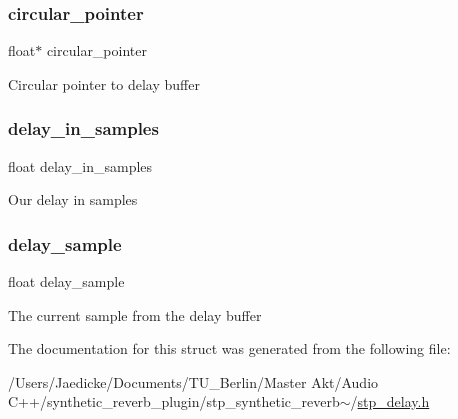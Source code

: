 \subsubsection{\texorpdfstring{circular\+\_\+pointer}{circular\_pointer}}
{\footnotesize\ttfamily float$\ast$ circular\+\_\+pointer}

Circular pointer to delay buffer \mbox{\label{structstp__delay_a1e57a43103f17324d4e3f4132fc8d195}} 
\subsubsection{\texorpdfstring{delay\+\_\+in\+\_\+samples}{delay\_in\_samples}}
{\footnotesize\ttfamily float delay\+\_\+in\+\_\+samples}

Our delay in samples \mbox{\label{structstp__delay_ab1cecaf78849bc3aadab1ef39c4f45b7}} 
\subsubsection{\texorpdfstring{delay\+\_\+sample}{delay\_sample}}
{\footnotesize\ttfamily float delay\+\_\+sample}

The current sample from the delay buffer 

The documentation for this struct was generated from the following file\+:\begin{DoxyCompactItemize}
\item 
/\+Users/\+Jaedicke/\+Documents/\+T\+U\+\_\+\+Berlin/\+Master Akt/\+Audio C++/synthetic\+\_\+reverb\+\_\+plugin/stp\+\_\+synthetic\+\_\+reverb$\sim$/\hyperlink{stp__delay_8h}{stp\+\_\+delay.\+h}\end{DoxyCompactItemize}
